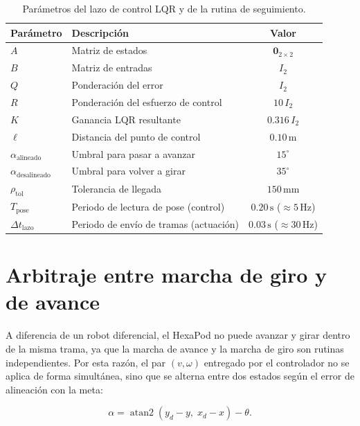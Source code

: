 \begin{table}[H]
\centering\captionsetup{width=0.8\linewidth}
\caption{Parámetros del lazo de control LQR y de la rutina de seguimiento.}
\begin{tabular}{llc}
\hline
\textbf{Parámetro} & \textbf{Descripción} & \textbf{Valor} \\
\hline
$A$ & Matriz de estados & $\mathbf{0}_{2\times2}$ \\
$B$ & Matriz de entradas & $I_2$ \\
$Q$ & Ponderación del error & $I_2$ \\
$R$ & Ponderación del esfuerzo de control & $10\,I_2$ \\
$K$ & Ganancia LQR resultante & $0.316\,I_2$ \\
$\ell$ & Distancia del punto de control & $0.10\,\text{m}$ \\
$\alpha_{\text{alineado}}$ & Umbral para pasar a avanzar & $15^\circ$ \\
$\alpha_{\text{desalineado}}$ & Umbral para volver a girar & $35^\circ$ \\
$\rho_{\text{tol}}$ & Tolerancia de llegada & $150\,\text{mm}$ \\
$T_{\text{pose}}$ & Periodo de lectura de pose (control) & $0.20\,\text{s}$ ($\approx 5\,\text{Hz}$) \\
$\Delta t_{\text{lazo}}$ & Periodo de envío de tramas (actuación) & $0.03\,\text{s}$ ($\approx 30\,\text{Hz}$) \\
\hline
\end{tabular}
\label{tab:parametros_lqr}
\end{table}

\section{Arbitraje entre marcha de giro y de avance}

A diferencia de un robot diferencial, el HexaPod no puede avanzar y girar dentro de la misma trama, ya que la marcha de avance y la marcha de giro son rutinas independientes. Por esta razón, el par $(v,\omega)$ entregado por el controlador no se aplica de forma simultánea, sino que se alterna entre dos estados según el error de alineación con la meta:

\begin{equation}
\alpha = \operatorname{atan2}\left(y_d - y,\; x_d - x\right) - \theta.
\end{equation}

